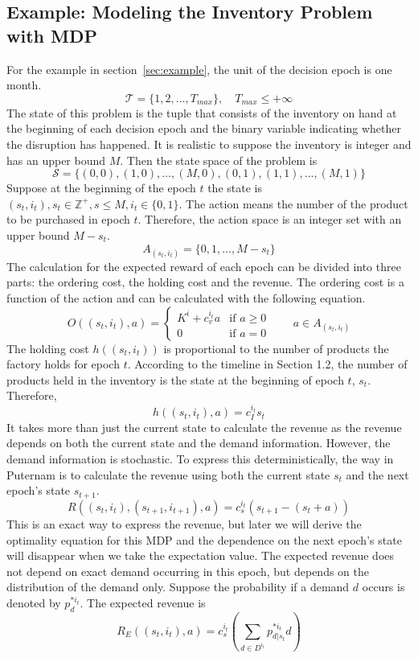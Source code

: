 \documentclass[11pt]{article}
\begin{document}
	\subsection{Example: Modeling the Inventory Problem with MDP}
		For the example in section~\ref{sec:example}, the unit of the decision epoch is one month. \[\mathscr{T}=\{1,2,\dots,T_{max}\}, \quad T_{max}\leq +\infty\]
		The state of this problem is the tuple that consists of the inventory on hand at the beginning of each decision epoch and the binary variable indicating whether the disruption has happened. It is realistic to suppose the inventory is integer and has an upper bound \(M\). Then the state space of the problem is \[\mathscr{S}=\{(0,0),(1,0),\dots,(M,0),(0,1),(1,1),\dots,(M,1)\}\]
		Suppose at the beginning of the epoch \(t\) the state is \((s_t,i_t),  s_t \in \mathbb{Z}^+, s \leq M, i_t \in \{0,1\}\). The action means the number of the product to be purchased in epoch \(t\). Therefore, the action space is an integer set with an upper bound \(M-s_t\). \[A_{(s_t,i_t)}=\{0, 1, \dots, M-s_t\}\]
		The calculation for the expected reward of each epoch can be divided into three parts: the ordering cost, the holding cost and the revenue. The ordering cost is a function of the action and can be calculated with the following equation. \[O((s_t,i_t),a) = \begin{cases}
		K^i+c_v^{i_t}a & \text{if } a \geq 0 \\
		0 & \text{if } a = 0
		\end{cases}
		\qquad a \in A_{(s_t,i_t)}\]
		The holding cost \(h((s_t,i_t))\) is proportional to the number of products the factory holds for epoch \(t\). According to the timeline in Section 1.2, the number of products held in the inventory is the state at the beginning of epoch \(t\), \(s_t\). Therefore, \[h((s_t,i_t),a)=c_I^{i_t}s_t\]
		It takes more than just the current state to calculate the revenue as the revenue depends on both the current state and the demand information. However, the demand information is stochastic. To express this deterministically, the way in Puternam is to calculate the revenue using both the current state \(s_t\) and the next epoch's state \(s_{t+1}\). \[R((s_t,i_t),(s_{t+1},i_{t+1}),a)=c_s^{i_t}(s_{t+1}-(s_{t}+a))\] 
		This is an exact way to express the revenue, but later we will derive the optimality equation for this MDP and the dependence on the next epoch's state will disappear when we take the expectation value. The expected revenue does not depend on exact demand occurring in this epoch, but depends on the distribution of the demand only. Suppose the probability if a demand \(d\) occurs is denoted by \(p^{*i_t}_d\). The expected revenue is \[R_E((s_t,i_t),a)=c_s^{i_t}(\sum_{d \in D^{i_t}}p^{*i_t}_{d|s_t}d)\]
\end{document}
